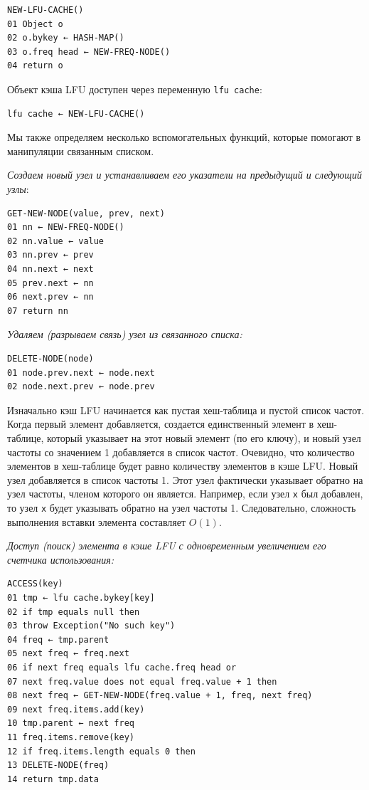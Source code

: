 \documentclass[a4paper, 12pt]{article}
\begin{document}
\begin{verbatim}
NEW-LFU-CACHE()
01 Object o
02 o.bykey ← HASH-MAP()
03 o.freq head ← NEW-FREQ-NODE()
04 return o
\end{verbatim}

Объект кэша LFU доступен через переменную \texttt{lfu cache}:
\begin{verbatim}
lfu cache ← NEW-LFU-CACHE()
\end{verbatim}

Мы также определяем несколько вспомогательных функций, которые помогают в манипуляции связанным списком.

\textit{Создаем новый узел и устанавливаем его указатели на предыдущий и следующий узлы}:
\begin{verbatim}
GET-NEW-NODE(value, prev, next)
01 nn ← NEW-FREQ-NODE()
02 nn.value ← value
03 nn.prev ← prev
04 nn.next ← next
05 prev.next ← nn
06 next.prev ← nn
07 return nn
\end{verbatim}

\textit{Удаляем (разрываем связь) узел из связанного списка:}
\begin{verbatim}
DELETE-NODE(node)
01 node.prev.next ← node.next
02 node.next.prev ← node.prev
\end{verbatim}

Изначально кэш LFU начинается как пустая хеш-таблица и пустой список частот. Когда первый элемент добавляется, создается единственный элемент в хеш-таблице, который указывает на этот новый элемент (по его ключу), и новый узел частоты со значением 1 добавляется в список частот. Очевидно, что количество элементов в хеш-таблице будет равно количеству элементов в кэше LFU. Новый узел добавляется в список частоты 1. Этот узел фактически указывает обратно на узел частоты, членом которого он является. Например, если узел \texttt{x} был добавлен, то узел \texttt{x} будет указывать обратно на узел частоты 1. Следовательно, сложность выполнения вставки элемента составляет $O(1)$.

\textit{Доступ (поиск) элемента в кэше LFU с одновременным увеличением его счетчика использования:}
\begin{verbatim}
ACCESS(key)
01 tmp ← lfu cache.bykey[key]
02 if tmp equals null then
03 throw Exception("No such key")
04 freq ← tmp.parent
05 next freq ← freq.next
06 if next freq equals lfu cache.freq head or
07 next freq.value does not equal freq.value + 1 then
08 next freq ← GET-NEW-NODE(freq.value + 1, freq, next freq)
09 next freq.items.add(key)
10 tmp.parent ← next freq
11 freq.items.remove(key)
12 if freq.items.length equals 0 then
13 DELETE-NODE(freq)
14 return tmp.data
\end{verbatim}
\end{document}
